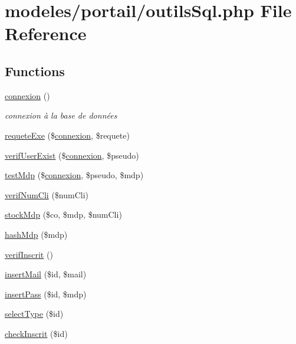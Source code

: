 \hypertarget{outils_sql_8php}{}\section{modeles/portail/outils\+Sql.php File Reference}
\label{outils_sql_8php}
\subsection*{Functions}
\begin{DoxyCompactItemize}
\item 
\hyperlink{outils_sql_8php_a72636d5958b9e74f0bf44d4f8088036e}{connexion} ()
\begin{DoxyCompactList}\small\item\em connexion à la base de données \end{DoxyCompactList}\item 
\hyperlink{outils_sql_8php_a7da8dba0c25ef6aa16108c2c0c2b222b}{requete\+Exe} (\$\hyperlink{outils_sql_8php_a72636d5958b9e74f0bf44d4f8088036e}{connexion}, \$requete)
\item 
\hyperlink{outils_sql_8php_a30824712094ef4c06d47ac4079dc16e3}{verif\+User\+Exist} (\$\hyperlink{outils_sql_8php_a72636d5958b9e74f0bf44d4f8088036e}{connexion}, \$pseudo)
\item 
\hyperlink{outils_sql_8php_a1eb7dbe3c18741b9accd1adac3d3d79e}{test\+Mdp} (\$\hyperlink{outils_sql_8php_a72636d5958b9e74f0bf44d4f8088036e}{connexion}, \$pseudo, \$mdp)
\item 
\hyperlink{outils_sql_8php_a7a9cf81142b4c4049ff0d0f9514312a6}{verif\+Num\+Cli} (\$num\+Cli)
\item 
\hyperlink{outils_sql_8php_a875d4fa49c5c99a24bced46df73bb67a}{stock\+Mdp} (\$co, \$mdp, \$num\+Cli)
\item 
\hyperlink{outils_sql_8php_a78a40e5cb223d04ab049dcf5cdcfcc0c}{hash\+Mdp} (\$mdp)
\item 
\hyperlink{outils_sql_8php_a619559f035ecbbb67411935113c9189f}{verif\+Inscrit} ()
\item 
\hyperlink{outils_sql_8php_a2c7e35b8ac11be4f7546958378797ded}{insert\+Mail} (\$id, \$mail)
\item 
\hyperlink{outils_sql_8php_a75e29b57fd98aeb0976aedb22431a42f}{insert\+Pass} (\$id, \$mdp)
\item 
\hyperlink{outils_sql_8php_add4bc70c76831581951cffe168ab075f}{select\+Type} (\$id)
\item 
\hyperlink{outils_sql_8php_ac0ff3db184d1d4931ecc034dc9904f69}{check\+Inscrit} (\$id)
\end{DoxyCompactItemize}


